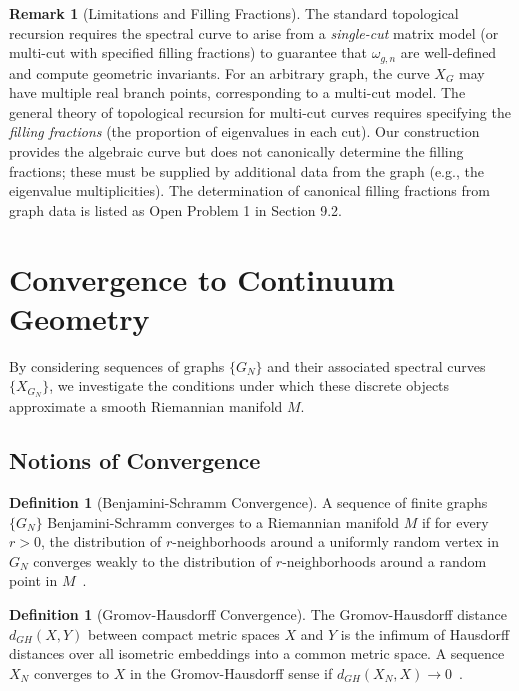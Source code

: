 \documentclass[12pt]{article}
\theoremstyle{definition}
\newtheorem{definition}[theorem]{Definition}
\newtheorem{remark}[theorem]{Remark}
\begin{document}
\begin{remark}[Limitations and Filling Fractions]\label{rem:filling_fractions}
The standard topological recursion requires the spectral curve to arise from a \emph{single-cut} matrix model (or multi-cut with specified filling fractions) to guarantee that $\omega_{g,n}$ are well-defined and compute geometric invariants. For an arbitrary graph, the curve $X_G$ may have multiple real branch points, corresponding to a multi-cut model. The general theory of topological recursion for multi-cut curves requires specifying the \emph{filling fractions} (the proportion of eigenvalues in each cut). Our construction provides the algebraic curve but does not canonically determine the filling fractions; these must be supplied by additional data from the graph (e.g., the eigenvalue multiplicities). The determination of canonical filling fractions from graph data is listed as Open Problem 1 in Section 9.2.
\end{remark}

\section{Convergence to Continuum Geometry}
By considering sequences of graphs $\{G_N\}$ and their associated spectral curves $\{X_{G_N}\}$, we investigate the conditions under which these discrete objects approximate a smooth Riemannian manifold $M$.

\subsection{Notions of Convergence}
\begin{definition}[Benjamini-Schramm Convergence]
A sequence of finite graphs $\{G_N\}$ Benjamini-Schramm converges to a Riemannian manifold $M$ if for every $r > 0$, the distribution of $r$-neighborhoods around a uniformly random vertex in $G_N$ converges weakly to the distribution of $r$-neighborhoods around a random point in $M$~\cite{Benjamini2001}.
\end{definition}

\begin{definition}[Gromov-Hausdorff Convergence]
The Gromov-Hausdorff distance $d_{GH}(X,Y)$ between compact metric spaces $X$ and $Y$ is the infimum of Hausdorff distances over all isometric embeddings into a common metric space. A sequence $X_N$ converges to $X$ in the Gromov-Hausdorff sense if $d_{GH}(X_N,X) \to 0$~\cite{Gromov1981}.
\end{definition}
\end{document}
